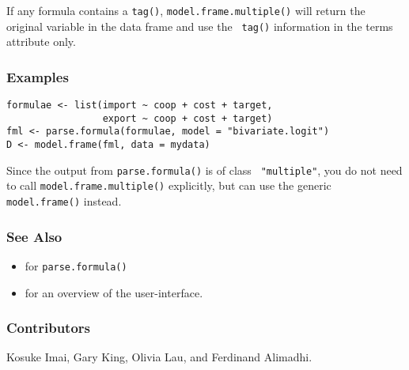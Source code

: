 If any formula contains a {\tt tag()}, {\tt model.frame.multiple()}
will return the original variable in the data frame and use the {\tt
tag()} information in the terms attribute only.

\subsubsection{Examples}
\begin{verbatim}
formulae <- list(import ~ coop + cost + target,
                 export ~ coop + cost + target)
fml <- parse.formula(formulae, model = "bivariate.logit")
D <- model.frame(fml, data = mydata)
\end{verbatim}
Since the output from {\tt parse.formula()} is of class {\tt
"multiple"}, you do not need to call {\tt model.frame.multiple()}
explicitly, but can use the generic {\tt model.frame()} instead.    

\subsubsection{See Also}
\begin{itemize}
\item {} for {\tt parse.formula()}
\item {} for an overview of the user-interface.  
\end{itemize}

\subsubsection{Contributors}

Kosuke Imai, Gary King, Olivia Lau, and Ferdinand Alimadhi.















